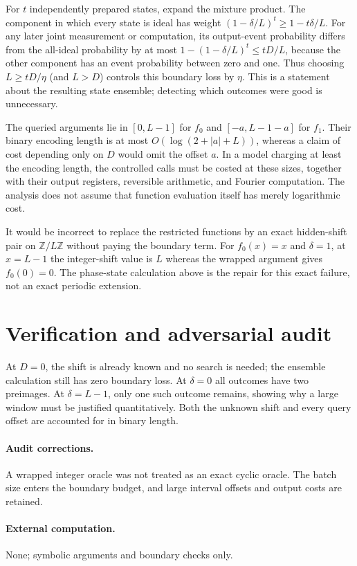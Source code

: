 \documentclass[11pt]{article}
\begin{document}
For $t$ independently prepared states, expand the mixture product. The component in which every state is ideal has weight $(1-\delta/L)^t\geq1-t\delta/L$. For any later joint measurement or computation, its output-event probability differs from the all-ideal probability by at most $1-(1-\delta/L)^t\leq tD/L$, because the other component has an event probability between zero and one. Thus choosing $L\geq tD/\eta$ (and $L>D$) controls this boundary loss by $\eta$. This is a statement about the resulting state ensemble; detecting which outcomes were good is unnecessary.

The queried arguments lie in $[0,L-1]$ for $f_0$ and $[-a,L-1-a]$ for $f_1$. Their binary encoding length is at most $O(\log(2+|a|+L))$, whereas a claim of cost depending only on $D$ would omit the offset $a$. In a model charging at least the encoding length, the controlled calls must be costed at these sizes, together with their output registers, reversible arithmetic, and Fourier computation. The analysis does not assume that function evaluation itself has merely logarithmic cost.

It would be incorrect to replace the restricted functions by an exact hidden-shift pair on $\mathbb Z/L\mathbb Z$ without paying the boundary term. For $f_0(x)=x$ and $\delta=1$, at $x=L-1$ the integer-shift value is $L$ whereas the wrapped argument gives $f_0(0)=0$. The phase-state calculation above is the repair for this exact failure, not an exact periodic extension.
\section{Verification and adversarial audit}
At $D=0$, the shift is already known and no search is needed; the ensemble calculation still has zero boundary loss. At $\delta=0$ all outcomes have two preimages. At $\delta=L-1$, only one such outcome remains, showing why a large window must be justified quantitatively. Both the unknown shift and every query offset are accounted for in binary length.
\paragraph{Audit corrections.} A wrapped integer oracle was not treated as an exact cyclic oracle. The batch size enters the boundary budget, and large interval offsets and output costs are retained.
\paragraph{External computation.} None; symbolic arguments and boundary checks only.
\end{document}
